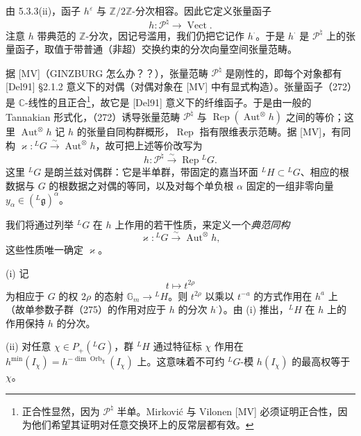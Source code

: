 由 5.3.3(ii)，函子 $h^{\varepsilon}$ 与 $\mathbb{Z}/2\mathbb{Z}$-分次相容。因此它定义张量函子
\begin{equation}\tag{272}
h:\mathcal{P}^{\natural}\to\operatorname{Vect}.
\end{equation}
注意 $h$ 带典范的 $\mathbb{Z}$-分次，因记号滥用，我们仍把它记作 $h^{\cdot}$。于是 $h^{\cdot}$ 是 $\mathcal{P}^{\natural}$ 上的张量函子，取值于带普通（非超）交换约束的分次向量空间张量范畴。

 据 [MV]（GINZBURG 怎么办？？），张量范畴 $\mathcal{P}^{\natural}$ 是刚性的，即每个对象都有 [Del91] §2.1.2 意义下的对偶（对偶对象在 [MV] 中有显式构造）。张量函子（272）是 $\mathbb{C}$-线性的且正合\footnote{正合性显然，因为 $\mathcal{P}^{\natural}$ 半单。Mirković 与 Vilonen [MV] 必须证明正合性，因为他们希望其证明对任意交换环上的反常层都有效。}，故它是 [Del91] 意义下的纤维函子。于是由一般的 Tannakian 形式化，（272）诱导张量范畴 $\mathcal{P}^{\natural}$ 与 $\operatorname{Rep}(\operatorname{Aut}^{\otimes}h)$ 之间的等价；这里 $\operatorname{Aut}^{\otimes}h$ 记 $h$ 的张量自同构群概形，$\operatorname{Rep}$ 指有限维表示范畴。据 [MV]，有同构 $\varkappa:{}^{L}G\xrightarrow{\sim}\operatorname{Aut}^{\otimes}h$，故可把上述等价改写为
\begin{equation}\tag{273}
h:\mathcal{P}^{\natural}\xrightarrow{\sim}\operatorname{Rep}{}^{L}G.
\end{equation}
这里 ${}^{L}G$ 是朗兰兹对偶群：它是半单群，带固定的嘉当环面 ${}^{L}H\subset{}^{L}G$、相应的根数据与 $G$ 的根数据之对偶的等同，以及对每个单负根 $\alpha$ 固定的一组非零向量 $y_{\alpha}\in({}^{L}\mathfrak{g})^{\alpha}$。


 我们将通过列举 ${}^{L}G$ 在 $h$ 上作用的若干性质，来定义一个\emph{典范同构}
\begin{equation}\tag{274}
\varkappa:{}^{L}G\xrightarrow{\sim}\operatorname{Aut}^{\otimes}h,
\end{equation}
这些性质唯一确定 $\varkappa$。

(i) 记
\begin{equation}\tag{275}
t\mapsto t^{2\rho}
\end{equation}
为相应于 $G$ 的权 $2\rho$ 的态射 $\mathbb{G}_m\to{}^{L}H$。则 $t^{2\rho}$ 以乘以 $t^{-a}$ 的方式作用在 $h^a$ 上（故单参数子群（275）的作用对应于 $h$ 的分次 $h^{\cdot}$）。由 (i) 推出，${}^{L}H$ 在 $h$ 上的作用保持 $h$ 的分次。

(ii) 对任意 $\chi\in P_+({}^{L}G)$，群 ${}^{L}H$ 通过特征标 $\chi$ 作用在 $h^{\min}(I_{\chi})=h^{-\dim\operatorname{Orb}_{\chi}}(I_{\chi})$ 上。这意味着不可约 ${}^{L}G$-模 $h(I_{\chi})$ 的最高权等于 $\chi$。

